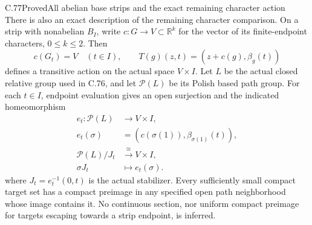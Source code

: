 \begin{claim}{C.77}{Proved}{All abelian base strips and the exact remaining character action}
There is also an exact description of the remaining
character comparison. On a strip with nonabelian $B_I$,
write $c:G\to V\subset\mathbb R^k$ for the vector of its
finite-endpoint characters, $0\leq k\leq2$. Then
\[
 c(G_t)=V\quad(t\in I),
 \qquad
 T(g)(z,t)=(z+c(g),\beta_g(t))
                                                               \tag{C.77.3}
\]
defines a transitive action on the actual space $V\times I$.
Let $L$ be the actual closed relative group used in C.76,
and let $\mathscr P(L)$ be its Polish based path group.
For each $t\in I$, endpoint evaluation gives an open
surjection and the indicated homeomorphism
\[
 \begin{aligned}
 e_t:\mathscr P(L)&\longrightarrow V\times I,\\
 e_t(\sigma)&=(c(\sigma(1)),\beta_{\sigma(1)}(t)),\\
 \mathscr P(L)/J_t&\xrightarrow{\ \cong\ }V\times I,\\
 \sigma J_t&\longmapsto e_t(\sigma).
 \end{aligned}                                                 \tag{C.77.4}
\]
where $J_t=e_t^{-1}(0,t)$ is the actual stabilizer.
Every sufficiently small compact target set has a compact
preimage in any specified open path neighborhood whose
image contains it. No continuous section, nor uniform
compact preimage for targets escaping towards a strip
endpoint, is inferred.
\end{claim}

